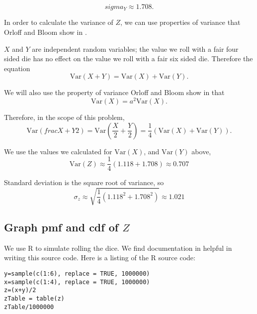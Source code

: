 \documentclass[a4paper,11pt]{article}
\begin{document}
\begin{equation}
	sigma_{Y} \approx 1.708.
\end{equation}

In order to calculate the variance of $Z$, we can use properties of variance
that Orloff and Bloom show in \cite{reading5a}.

$X$ and $Y$ are independent random variables; the value we roll with a fair four
sided die has no effect on the value we roll with a fair six sided die.
Therefore the equation
\begin{equation}
	\text{Var}\left(X + Y \right)
	= \text{Var}\left(X \right) + \text{Var}\left( Y \right).
\end{equation}

We will also use the property of variance Orloff and Bloom show in
\cite{reading5a} that
\begin{equation}
	\text{Var}\left(X \right) = a^{2}\text{Var}\left(X \right).
\end{equation}

Therefore, in the scope of this problem,
\begin{equation}
	\text{Var} \left(frac{X+Y}{2} \right)
		= \text{Var}\left( \frac{X}{2} + \frac{Y}{2} \right)
		= \frac{1}{4} \left( \text{Var}\left( X \right)
			+ \text{Var}\left( Y \right)\right).
\end{equation}

We use the values we calculated for $\text{Var}\left(X \right)$, and
$\text{Var}\left(Y \right)$ above,
\begin{equation}
	\text{Var}\left(Z \right) \approx \frac{1}{4}\left(1.118 + 1.708 \right)
		\approx 0.707
\end{equation}

Standard deviation is the square root of variance, so
\begin{equation}
	\sigma_{z} \approx \sqrt{\frac{1}{4}\left(1.118^{2} + 1.708^{2} \right)}
		\approx 1.021
\end{equation}

\subsection{Graph pmf and cdf of $Z$}

We use R to simulate rolling the dice.  We find documentation in \cite{rTable}
helpful in writing this source code.  Here is a listing of the R source
code:
\begin{lstlisting}
y=sample(c(1:6), replace = TRUE, 1000000)
x=sample(c(1:4), replace = TRUE, 1000000)
z=(x+y)/2
zTable = table(z)
zTable/1000000
\end{lstlisting}
\end{document}
